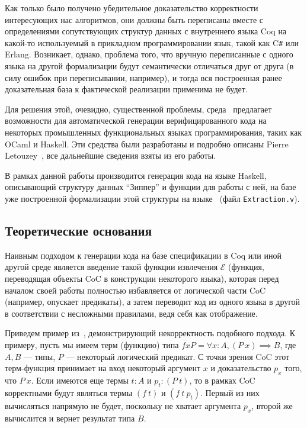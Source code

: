 Как только было получено убедительное доказательство корректности интересующих нас алгоритмов, они должны быть переписаны вместе с определениями сопутствующих структур данных с внутреннего языка Coq на какой-то используемый в прикладном программировании язык, такой как C\texttt{\#} или Erlang. Возникает, однако, проблема того, что вручную переписанные с одного языка на другой формализации будут семантически отличаться друг от друга (в силу ошибок при переписывании, например), и тогда вся построенная ранее доказательная база к фактической реализации применима не будет. 

Для решения этой, очевидно, существенной проблемы, среда \tcoq~предлагает возможности для автоматической генерации верифицированного кода на некоторых промышленных функциональных языках программирования, таких как OCaml и Haskell. Эти средства были разработаны и подробно описаны Pierre Letouzey~\autocite{Pierre2004}, все дальнейшие сведения взяты из его работы.

В рамках данной работы производится генерация кода на языке Haskell, описывающий структуру данных ``Зиппер'' и функции для работы с ней, на базе уже построенной формализации этой структуры на языке \tcoq~(файл \texttt{Extraction.v}).

\subsection{Теоретические основания}
Наивным подходом к генерации кода на базе спецификации в Coq или иной другой среде является введение такой функции извлечения $\mathcal{E}$ (функция, переводящая объекты CoC в конструкции некоторого языка), которая перед началом своей работы полностью избавляется от логической части CoC (например, опускает предикаты), а затем переводит код из одного языка в другой в соответствии с несложными правилами, ведя себя как отображение.

Приведем пример из~\autocite{Pierre2004}, демонстрирующий некорректность подобного подхода. К примеру, пусть мы имеем терм (функцию) типа $f x P = \forall x : A, (P\ x) \implies B$, где $A, B$ --- типы, $P$ --- некоторый логический предикат. С точки зрения CoC этот терм-функция принимает на вход некоторый аргумент $x$ и доказательство $p_x$ того, что $P\ x$. Если имеются еще термы $t:A$ и $p_t:(P\ t)$, то в рамках CoC корректными будут являться термы $(f\ t)$ и $(f\ t\ p_t)$. Первый из них вычисляться напрямую не будет, поскольку не хватает аргумента $p_x$, второй же вычислится и вернет результат типа $B$.


